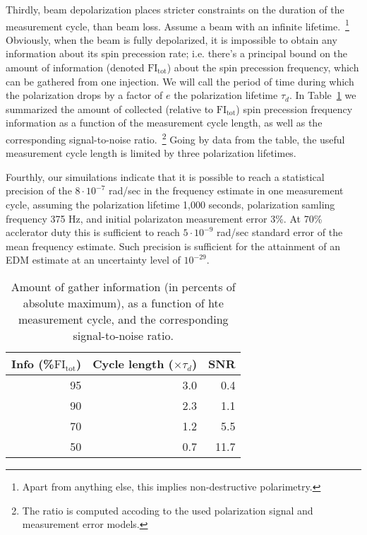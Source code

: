Thirdly, beam depolarization places stricter constraints on the duration of the measurement cycle, than
 beam loss. Assume a beam with an infinite lifetime.~\footnote{Apart from anything else,
  this implies non-destructive polarimetry.} Obviously, when the beam is fully depolarized, it is impossible to
obtain any information about its spin precession rate; i.e. there's a principal bound on the amount of information
(denoted $\mathrm{FI_{tot}}$) about the spin precession frequency, which can be gathered from one injection.
We will call the period of time during which the polarization drops by a factor of $e$
the polarization lifetime $\tau_d$. In Table~\ref{tbl:FItot} we summarized the amount of collected
(relative to $\mathrm{FI_{tot}}$) spin precession frequency information as a function of the measurement cycle
length, as well as the corresponding signal-to-noise ratio.~\footnote{The ratio is computed accoding to
  the used polarization signal and measurement error models.} Going by data from the table, the useful
measurement cycle length is limited by three polarization lifetimes.

Fourthly, our simuilations indicate that it is possible to reach a statistical precision of the 
$8\cdot 10^{-7}$ rad/sec in the frequency estimate in one measurement cycle, assuming the polarization
lifetime 1,000 seconds, polarization samling frequency 375 Hz, and initial polarizaton measurement error 3\%.
At 70\% acclerator duty this is sufficient to reach $5\cdot 10^{-9}$ rad/sec standard error of the mean
frequency estimate. Such precision is sufficient for the attainment of an EDM estimate
at an uncertainty level of $10^{-29}$\ecm.

\begin{table}[h]
	\caption{Amount of gather information (in percents of absolute maximum), as a function of hte measurement cycle, and the corresponding signal-to-noise ratio.\label{tbl:FItot}}
	
	\centering
	\begin{tabular}{rrr}
		\hline
		Info (\%$\mathrm{FI_{tot}}$) & Cycle length ($\times\tau_d$) & SNR  \\
		\hline
		95            & 3.0                     & 0.4         \\
		90            & 2.3                     & 1.1         \\
		70            & 1.2                     & 5.5         \\
		50            & 0.7                     & 11.7        \\
		\hline
	\end{tabular}
\end{table}


